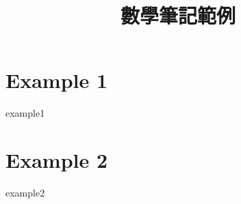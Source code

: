 \documentclass[11pt]{book}
\title{數學筆記範例}
\begin{document}
\maketitle
\characterPage

\chapter{Example 1}
{example1}

\chapter{Example 2}
{example2}
\end{document}
